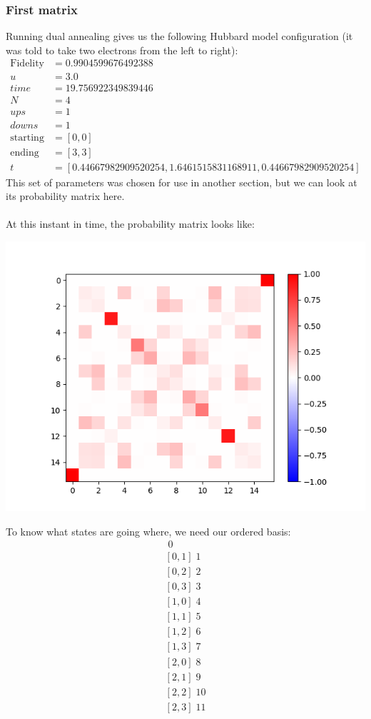\subsubsection{First matrix}
Running dual annealing gives us the following Hubbard model configuration (it was told to take two electrons from the left to right):
\begin{align*}
    \text{Fidelity} &= 0.9904599676492388 \\
    u &= 3.0 \\
    time &= 19.756922349839446 \\
    N &= 4 \\
    ups &= 1 \\
    downs &= 1 \\
    \text{starting} &= [0,0]\\
    \text{ending} &=  [3,3] \\
    t &= [0.44667982909520254,1.6461515831168911,0.44667982909520254]
\end{align*}
This set of parameters was chosen for use in another section, but we can look at its probability matrix here. \\
\\
At this instant in time, the probability matrix looks like:
\begin{center}
    \includegraphics*[scale= 1]{HubbardFirstMatrixProbabilityMatrix.png}
\end{center}
To know what states are going where, we need our ordered basis:
\begin{align*}
    [0, 0]\; 0 \\
    [0, 1]\; 1 \\
    [0, 2]\; 2 \\
    [0, 3]\; 3 \\
    [1, 0]\; 4 \\
    [1, 1]\; 5 \\
    [1, 2]\; 6 \\
    [1, 3]\; 7 \\
    [2, 0]\; 8 \\
    [2, 1]\; 9 \\
    [2, 2]\; 10 \\
    [2, 3]\; 11 \\
\end{align*}
